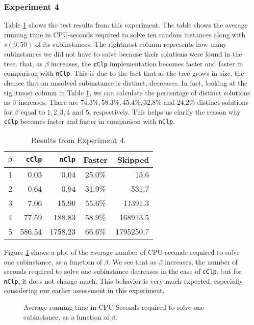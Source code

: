 \subsubsection{Experiment 4}
Table \ref{table:exptwo} shows the test results from this experiment.
The table shows the average running time in CPU-seconds required to solve
ten random instances along with $s(\beta, 50)$ of its subinstances.
The rightmost column represents how many subinstances we did not have to
solve because their solutions were found in the tree.
that, as $\beta$ increases, the \texttt{cClp} implementation becomes
faster and faster in comparison with \texttt{nClp}.
This is due to the fact that as the tree grows in size, the chance that
an unsolved subinstance is distinct, decreases. In fact, looking at the
rightmost column in Table \ref{table:exptwo}, we can calculate the percentage
of distinct solutions as $\beta$ increases.
There are $74.3\%, 58.3\%, 45.4\%, 32.8\%$ and $24.2\%$ distinct solutions for
$\beta$ equal to $1,2,3,4$ and $5$, respectively. This helps us clarify the reason
why \texttt{cClp} becomes faster and faster in comparison with \texttt{nClp}.
\begin{table}[ht!]
\centering
\caption{Results from Experiment 4.}
\begin{tabular}{rrrcr}
      $\beta$ & \texttt{cClp} & \texttt{nClp} & Faster & Skipped\\ \hline
       1  & 0.03 & 0.04 & 25.0\% & 13.6 \\
       2  & 0.64 & 0.94 & 31.9\% & 531.7 \\
       3  & 7.06 & 15.90 & 55.6\% & 11391.3 \\
       4  & 77.59 & 188.83 & 58.9\% & 168913.5 \\
       5  & 586.54 & 1758.23 & 66.6\% & 1795250.7 \\
\end{tabular}
\label{table:exptwo}
\end{table}

Figure \ref{fig:constructincb} shows a plot of the average number of
CPU-seconds required to solve one subinstance, as a function of $\beta$.
We see that as $\beta$ increases, the number of seconds required to solve
one subinstance decreases in the case of \texttt{cClp},
but for \texttt{nClp}, it does not change much. This behavior is very
much expected, especially considering our earlier assessment in this
experiment.

\begin{figure}[ht!]
    \centering
    
    \caption{Average running time in CPU-Seconds required to solve one subinstance,
             as a function of $\beta$.}
    \label{fig:constructincb}
\end{figure}

